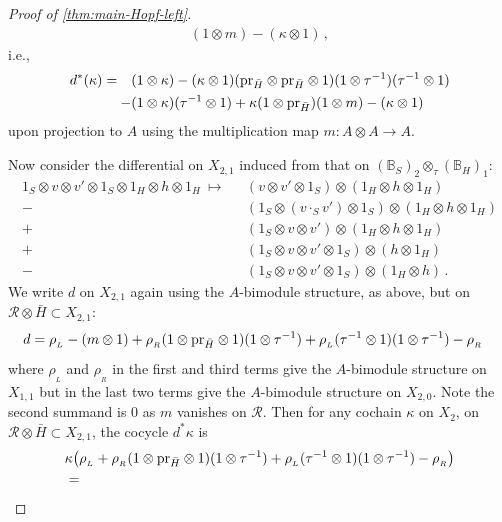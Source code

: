 \documentclass[11pt]{amsart}
\numberwithin{equation}{section}
\newcommand{\X}{_X}
\newcommand{\gammax}{\kappa} %
\newcommand{\pr}{ {\rm{pr}} }%
\newcommand{\R}{\mathcal{R}}
\newcommand{\BB}{\mathbb{B}} %
\newcommand{\itau}{{\tau^{-1}}}%
\renewcommand{\_}[1]{\mbox{$_{\left( #1 \right)}$}}
\newcommand{\ot}{\otimes}
\begin{document}
{\begin{proof}[Proof of \cref{thm:main-Hopf-left}]
\begin{equation*}
\begin{aligned}
(1\ot m)-(\gammax\ot 1) 
\, ,
\end{aligned}
\end{equation*}
i.e.,
\begin{equation}\label{donX12}
\begin{aligned}
  d^*(\gammax) 
 =\ \ \ 
&(1\ot \gammax)-
(\gammax\ot 1) (\pr_{\bar H}\ot \pr_{\bar H}\ot 1)
(1\ot\itau)(\itau\ot 1) 
\\  - &(1\ot \gammax)(\itau\ot 1)+\gammax  (1\ot \pr_{\bar H}) (1\ot m)
-(\gammax\ot 1) 
\end{aligned}
\end{equation}
 upon projection to $A$ using the multiplication map
 $m:A\ot A\rightarrow A$.
 
Now consider the differential on $X_{2,1}$
induced from that on $(\BB_S)_2\ot_{\tau} (\BB_H)_1$:
$$
\begin{aligned}
1_S\ot v\ot v'\ot 1_S \ot 1_H\ot h\ot 1_H
\ \mapsto\ \ \ 
 &(v\ot v'\ot 1_S)\ot (1_H\ot h\ot 1_H)\\
-&(1_S\ot (v\cdot_S v')\ot 1_S)\ot (1_H\ot h\ot 1_H)\\
+&(1_S\ot v\ot v')\ot (1_H\ot h\ot 1_H)\\
 +&(1_S\ot v\ot v'\ot 1_S)\ot (h\ot 1_H)\\
 - &(1_S\ot v\ot v'\ot 1_S)\ot (1_H\ot h) 
 \, . 
\end{aligned}
$$
We write $d$ on $X_{2,1}$ again using the $A$-bimodule structure, as
above,
but on
$\R\ot \bar H\subset X_{2,1}$:
\begin{equation}
\begin{aligned}%
d 
 &=
 \rho_{_L} - (m\ot 1) + \rho_{_R} (1\ot \pr_{\bar H}\ot 1)
 (1\ot \itau) + \rho_{_L}(\itau\ot 1 
)(1\ot \itau) - \rho_{_R} 
\end{aligned}
\end{equation}
where $\rho_{_L}$ 
and $\rho_{_R}$ in the first and third terms
give the $A$-bimodule structure on $X_{1,1}$
but in the last two terms
give the $A$-bimodule structure on $X_{2,0}$.
Note the second summand is $0$ as $m$ vanishes on $\R$.
Then 
for any cochain $\gammax$ on $X_2$,
on $\R\ot \bar H\subset X_{2,1}$,
the cocycle
$d^*\gammax$ is
\begin{equation*}
\begin{aligned}
 & \gammax \big(\rho_{_L} +
  \rho_{_R}(1\ot \pr_{\bar H}\ot 1)
 (1\ot \itau) + \rho_{_L}(\itau\ot 1 )(1\ot \itau) - \rho_{_R} \big)
\\ &=

\end{aligned}
\end{equation*}
\end{proof}}
\end{document}
